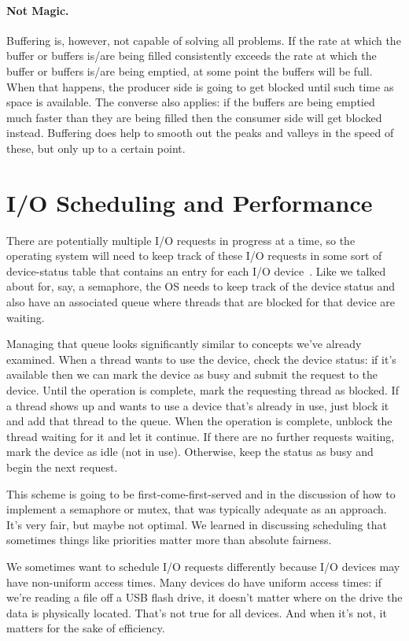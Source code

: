 \paragraph{Not Magic.}
Buffering is, however, not capable of solving all problems. If the rate at which the buffer or buffers is/are being filled consistently exceeds the rate at which the  buffer or buffers is/are being emptied, at some point the buffers will be full. When that happens, the producer side is going to get blocked until such time as space is available. The converse also applies: if the buffers are being emptied much faster than they are being filled then the consumer side will get blocked instead. Buffering does help to smooth out the peaks and valleys in the speed of these, but only up to a certain point.


\section*{I/O Scheduling and Performance}

There are potentially multiple I/O requests in progress at a time, so the operating system will need to keep track of these I/O requests in some sort of device-status table that contains an entry for each I/O device~\cite{osc}. Like we talked about for, say, a semaphore, the OS needs to keep track of the device status and also have an associated queue where threads that are blocked for that device are waiting.

Managing that queue looks significantly similar to concepts we've already examined. When a thread wants to use the device, check the device status: if it's available then we can mark the device as busy and submit the request to the device. Until the operation is complete, mark the requesting thread as blocked. If a thread shows up and wants to use a device that's already in use, just block it and add that thread to the queue. When the operation is complete, unblock the thread waiting for it and let it continue. If there are no further requests waiting, mark the device as idle (not in use). Otherwise, keep the status as busy and begin the next request.

This scheme is going to be first-come-first-served and in the discussion of how to implement a semaphore or mutex, that was typically adequate as an approach. It's very fair, but maybe not optimal. We learned in discussing scheduling that sometimes things like priorities matter more than absolute fairness.

We sometimes want to schedule I/O requests differently because I/O devices may have non-uniform access times. Many devices do have uniform access times: if we're reading a file off a USB flash drive, it doesn't matter where on the drive the data is physically located. That's not true for all devices. And when it's not, it matters for the sake of efficiency.

